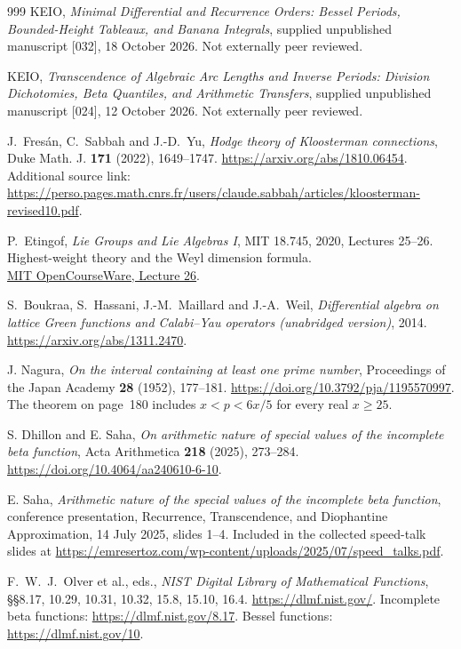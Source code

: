 \documentclass[11pt,a4paper]{article}
\theoremstyle{definition}
\theoremstyle{remark}
\numberwithin{equation}{section}
\begin{document}
\begin{thebibliography}{999}
KEIO, \emph{Minimal Differential and Recurrence Orders: Bessel Periods,
Bounded-Height Tableaux, and Banana Integrals}, supplied unpublished
manuscript [032], 18 October 2026. Not externally peer reviewed.

KEIO, \emph{Transcendence of Algebraic Arc Lengths and Inverse Periods:
Division Dichotomies, Beta Quantiles, and Arithmetic Transfers},
supplied unpublished manuscript [024], 12 October 2026.
Not externally peer reviewed.

J.~Fres\'an, C.~Sabbah and J.-D.~Yu,
\emph{Hodge theory of Kloosterman connections},
Duke Math. J. \textbf{171} (2022), 1649--1747.
\url{https://arxiv.org/abs/1810.06454}.
Additional source link: \url{https://perso.pages.math.cnrs.fr/users/claude.sabbah/articles/kloosterman-revised10.pdf}.

P.~Etingof, \emph{Lie Groups and Lie Algebras I}, MIT 18.745,
2020, Lectures 25--26.\\
Highest-weight theory and the Weyl dimension formula.\\
\href{https://ocw.mit.edu/courses/18-745-lie-groups-and-lie-algebras-i-fall-2020/mit18_745_f20_lec26.pdf}{MIT OpenCourseWare, Lecture 26}.

S.~Boukraa, S.~Hassani, J.-M.~Maillard and J.-A.~Weil,
\emph{Differential algebra on lattice Green functions and Calabi--Yau
operators (unabridged version)}, 2014.
\url{https://arxiv.org/abs/1311.2470}.

J. Nagura,
\emph{On the interval containing at least one prime number},
Proceedings of the Japan Academy \textbf{28} (1952), 177--181.
\url{https://doi.org/10.3792/pja/1195570997}.
The theorem on page~180 includes $x<p<6x/5$ for every real $x\ge25$.

S. Dhillon and E. Saha,
\emph{On arithmetic nature of special values of the incomplete beta function},
Acta Arithmetica \textbf{218} (2025), 273--284.
\url{https://doi.org/10.4064/aa240610-6-10}.

E. Saha,
\emph{Arithmetic nature of the special values of the incomplete beta function},
conference presentation, Recurrence, Transcendence, and Diophantine
Approximation, 14 July 2025, slides 1--4.
Included in the collected speed-talk slides at
\url{https://emresertoz.com/wp-content/uploads/2025/07/speed_talks.pdf}.

F.~W.~J.~Olver et al., eds., \emph{NIST Digital Library of Mathematical Functions}, \S\S8.17, 10.29, 10.31, 10.32, 15.8, 15.10, 16.4. \url{https://dlmf.nist.gov/}. Incomplete beta functions: \url{https://dlmf.nist.gov/8.17}. Bessel functions: \url{https://dlmf.nist.gov/10}.


\end{thebibliography}
\end{document}
